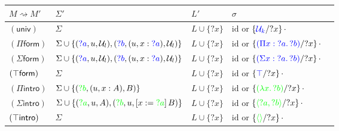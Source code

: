 \documentclass[twoside]{report}
\begin{document}
\begin{table}
    \centering
    \begin{tabular}{lllll}\hline
        $M \rightsquigarrow M'$ & $\Sigma'$                                                                                                                      & $L'$ & $\sigma$ \\
        \hline
        $(\mathsf{univ})$
                                & $\Sigma$
                                & $L \cup \{?x\}$
                                & $\mathrm{id}$ or $\subst {?x} {\textcolor{blue}{\mathcal U_k}} {\cdot}$
        \\
        $(\Pi\mathsf{form})$
                                & $\Sigma \cup \{(\textcolor{blue}{?a}, u, \mathcal U_l), (\textcolor{blue}{?b}, (u, x : \textcolor{blue}{?a}), \mathcal U_l)\}$
                                & $L \cup \{?x\}$
                                & $\mathrm{id}$ or $\subst {?x} {\textcolor{blue}{(\ppi x {?a} {?b})}} {\cdot}$
        \\
        $(\Sigma\mathsf{form})$
                                & $\Sigma \cup \{(\textcolor{blue}{?a}, u, \mathcal U_l), (\textcolor{blue}{?b}, (u, x : \textcolor{blue}{?a}), \mathcal U_l)\}$
                                & $L \cup \{?x\}$
                                & $\mathrm{id}$ or $\subst {?x} {\textcolor{blue}{(\sig x {?a} {?b})}} {\cdot}$
        \\
        $(\unit\mathsf{form})$
                                & $\Sigma$
                                & $L \cup \{?x\}$
                                & $\mathrm{id}$ or $\subst {?x} {\textcolor{blue}{\unit}} {\cdot}$
        \\
        $(\Pi\mathsf{intro})$
                                & $\Sigma \cup \{(\textcolor{green}{?b}, (u, x : A), B)\}$
                                & $L \cup \{?x\}$
                                & $\mathrm{id}$ or $\subst {?x} {\textcolor{green}{(\lam x {?b})}} {\cdot}$
        \\
        $(\Sigma\mathsf{intro})$
                                & $\Sigma \cup \{(\textcolor{green}{?a}, u, A), (\textcolor{green}{?b}, u, \llet x {\textcolor{green}{?a}} B)\}$
                                & $L \cup \{?x\}$
                                & $\mathrm{id}$ or $\subst {?x} {\textcolor{green}{\pair {?a} {?b}}} {\cdot}$
        \\
        $(\unit\mathsf{intro})$
                                & $\Sigma$
                                & $L \cup \{?x\}$
                                & $\mathrm{id}$ or $\subst {?x} {\textcolor{green}{\sstar}} {\cdot}$

\end{tabular}
\end{table}
\end{document}
